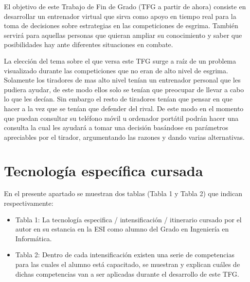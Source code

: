 \documentclass[11pt,a4paper,twoside,final]{article}
\begin{document}
\bigskip
El objetivo de este Trabajo de Fin de Grado (TFG a partir de ahora) consiste en desarrollar un entrenador virtual que sirva como apoyo en tiempo real para la toma de decisiones sobre estrategias en las competiciones de esgrima. También servirá para aquellas personas que quieran ampliar su conocimiento y saber que posibilidades hay ante diferentes situaciones en combate.

\bigskip
La elección del tema sobre el que versa este TFG surge a raíz de un problema visualizado durante las competiciones que no eran de alto nivel de esgrima. Solamente los tiradores de mas alto nivel tenían un entrenador personal que les pudiera ayudar, de este modo ellos solo se tenían que preocupar de llevar a cabo lo que les decían. Sin embargo el resto de tiradores tenían que pensar en que hacer a la vez que se tenían que defender del rival. De este modo en el momento que puedan consultar su teléfono móvil u ordenador portátil podrán hacer una consulta la cual les ayudará a tomar una decisión basándose en parámetros apreciables por el tirador, argumentando las razones y dando varias alternativas.
\fi

\newpage

\section{Tecnología específica cursada}
En el presente apartado se muestran dos tablas (Tabla 1 y Tabla 2) que indican respectivamente:
\begin{itemize}
    \item Tabla 1: La tecnología especifica / intensificación / itinerario cursado por el autor en su estancia en la ESI como alumno del Grado en Ingeniería en Informática.
    \item Tabla 2: Dentro de cada intensificación existen una serie de competencias para las cuales el alumno está capacitado, se muestran y explican cuáles de dichas competencias van a ser aplicadas durante el desarrollo de este TFG.
\end{itemize}

\end{document}
